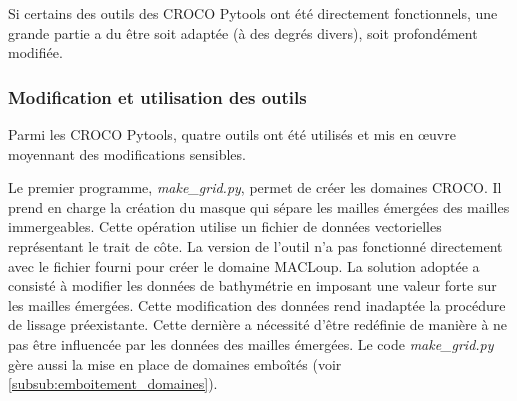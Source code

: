 \documentclass[10pt,a4paper,titlepage]{article}
\begin{document}
Si certains des outils des CROCO Pytools ont été directement fonctionnels, une grande partie a du être soit adaptée (à des degrés divers), soit profondément modifiée.

\subsubsection{Modification et utilisation des outils}
\label{subsub:modif_ytilisation_pytools}

Parmi les CROCO Pytools, quatre outils ont été utilisés et mis en \oe{uvre} moyennant des modifications sensibles.

Le premier programme, \textit{make\_grid.py}, permet de créer les domaines CROCO.
Il prend en charge la création du masque qui sépare les mailles émergées des mailles immergeables.
Cette opération utilise un fichier de données vectorielles représentant le trait de côte.
La version de l'outil n'a pas fonctionné directement avec le fichier fourni pour créer le domaine MACLoup.
La solution adoptée a consisté à modifier les données de bathymétrie en imposant une valeur forte sur les mailles émergées.
Cette modification des données rend inadaptée la procédure de lissage préexistante.
Cette dernière a nécessité d'être redéfinie de manière à ne pas être influencée par les données des mailles émergées.
Le code \textit{make\_grid.py} gère aussi la mise en place de domaines emboîtés (voir \ref{subsub:emboitement_domaines}).
\end{document}
